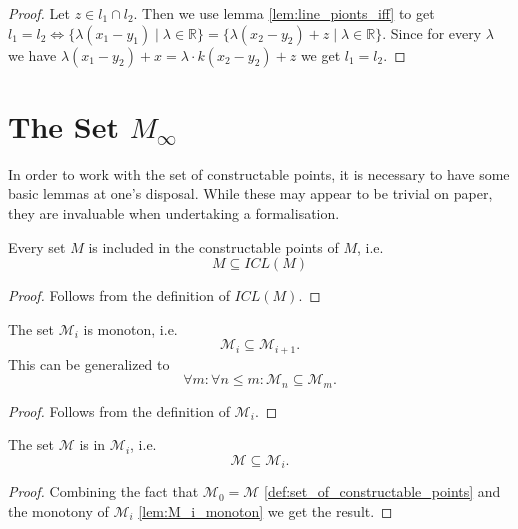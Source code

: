 \begin{proof}
    \leanok
    Let $z\in l_1 \cap l_2$. Then we use lemma \ref{lem:line_pionts_iff} to get $l_1 = l_2 \Leftrightarrow \{\lambda (x_1-y_1)\mid\lambda\in\mathbb{R}\} = \{\lambda (x_2- y_2)+z\mid\lambda\in\mathbb{R}\}$.
    Since for every $\lambda$ we have $\lambda (x_1-y_2) + x = \lambda \cdot k(x_2- y_2)+z$ we get $l_1 = l_2$.
 \end{proof}

\section[The set of constructable points]{The Set $M_{\infty}$}\label{set_of_constructable_points}
In order to work with the set of constructable points, it is necessary to have some basic lemmas at one's disposal. 
While these may appear to be trivial on paper, they are invaluable when undertaking a formalisation.

\begin{lemma}
    \label{lem:M_in_ICL_M}
    \leanok
    Every set $M$ is included in the constructable points of $M$, i.e.
    \[M \subseteq ICL(M)\]
\end{lemma}
\begin{proof}
    \leanok
    Follows from the definition of $ICL(M)$.
\end{proof}

\begin{lemma}
    \label{lem:M_i_monoton}
    \leanok
    The set $\mathcal{M}_i$ is monoton, i.e. $$\mathcal{M}_i \subseteq \mathcal{M}_{i+1}.$$
    This can be generalized to $$\forall m :\forall n\le m : \mathcal{M}_n \subseteq \mathcal{M}_m.$$
\end{lemma}
\begin{proof}
    \leanok
    Follows from the definition of $\mathcal{M}_i$.
\end{proof}

\begin{lemma}
    \label{lem:M_in_Mi}
    \leanok
    The set $\mathcal{M}$ is in $\mathcal{M}_i$, i.e. $$\mathcal{M} \subseteq \mathcal{M}_i.$$
\end{lemma}
\begin{proof}
    \leanok
    Combining the fact that $\mathcal{M}_0 = \mathcal{M}$ \ref{def:set_of_constructable_points} and the monotony of $\mathcal{M}_i$ \ref{lem:M_i_monoton} we get the result.
\end{proof}

